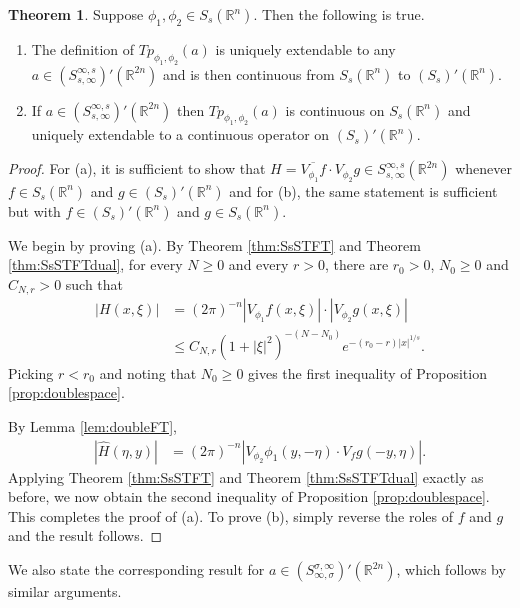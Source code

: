 \documentclass[11pt,a4paper,reqno]{amsart}
\numberwithin{equation}{section}
\theoremstyle{definition}
\newtheorem{thm}{Theorem}[section]
\theoremstyle{definition}
\begin{document}
    \begin{thm}
    Suppose $\phi_1,\phi_2 \in S_s(\mathbb{R}^n)$. Then the following is true.
    \begin{enumerate}[label=(\alph*)]
        \item The definition of $Tp_{\phi_1,\phi_2}(a)$ is uniquely extendable to any $a\in (S_{s,\infty}^{\infty,s})'(\mathbb{R}^{2 n})$ and is then continuous from $S_s(\mathbb{R}^n)$ to $(S_s)'(\mathbb{R}^n)$.
        \item If $a\in (S_{s,\infty}^{\infty,s})'(\mathbb{R}^{2 n})$ then $Tp_{\phi_1,\phi_2}(a)$ is continuous on $S_s(\mathbb{R}^n)$ and uniquely extendable to a continuous operator on $(S_s)'(\mathbb{R}^n)$.
    \end{enumerate}
    \end{thm}
    \begin{proof}
    For (a), it is sufficient to show that $H = \overline{V_{\phi_1} f}\cdot V_{\phi_2} g \in S_{s,\infty}^{\infty,s}(\mathbb{R}^{2 n})$ whenever $f\in S_s(\mathbb{R}^n)$ and $g\in (S_s)'(\mathbb{R}^n)$ and for (b), the same statement is sufficient but with $f\in (S_s)'(\mathbb{R}^n)$ and $g\in S_s(\mathbb{R}^n)$. 
    
    We begin by proving (a). By Theorem \ref{thm:SsSTFT} and Theorem \ref{thm:SsSTFTdual}, for every $N\geq 0$ and every $r>0$, there are $r_0 > 0$, $N_0 \geq 0$ and $C_{N,r} > 0$ such that
    \begin{align*}
        |H(x,\xi)| &= (2\pi)^{-n} | V_{\phi_1} f (x,\xi)|\cdot |V_{\phi_2}g(x,\xi)| \\
        &\leq C_{N,r} (1 + |\xi|^2)^{-(N-N_0)} e^{-(r_0-r) |x|^{1/s}}.
    \end{align*}
    Picking $r<r_0$ and noting that $N_0 \geq 0$ gives the first inequality of Proposition \ref{prop:doublespace}.
    
    By Lemma \ref{lem:doubleFT},
    \begin{align*}
       |\hat{H}(\eta,y)| &= (2\pi)^{-n} | V_{\phi_2} \phi_1 (y,-\eta) \cdot V_f g(-y,\eta)|.
    \end{align*}
    Applying Theorem \ref{thm:SsSTFT} and Theorem \ref{thm:SsSTFTdual} exactly as before, we now obtain the second inequality of Proposition \ref{prop:doublespace}. This completes the proof of (a). To prove (b), simply reverse the roles of $f$ and $g$ and the result follows.
    
    \end{proof}
    We also state the corresponding result for $a\in (S_{\infty,\sigma}^{\sigma,\infty})'(\mathbb{R}^{2 n})$, which follows by similar arguments.
\end{document}
